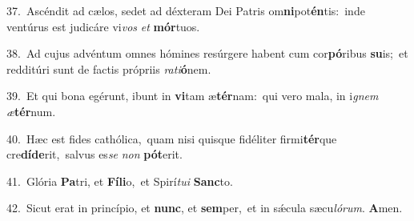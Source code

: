 {\numbfont\textcolor{\numbcolor}{37.}}~Ascéndit ad cælos, sedet ad déxteram Dei Patris om\-\textbf{ni}\-pot\-\textbf{én}\-tis:~\star inde ventúrus est judicáre vi\textit{vos} \textit{et} \textbf{mór}\-tuos.\par
{\numbfont\textcolor{\numbcolor}{38.}}~Ad cujus advéntum omnes hómines resúrgere habent cum cor\-\textbf{pó}\-ribus \textbf{su}\-is;~\star et redditúri sunt de factis própriis \textit{ra}\-\textit{ti}\textbf{ó}nem.\par
{\numbfont\textcolor{\numbcolor}{39.}}~Et qui bona egérunt, ibunt in \textbf{vi}\-tam æ\-\textbf{tér}\-nam:~\star qui vero mala, in i\textit{gnem} \textit{æ}\-\textbf{tér}num.\par
{\numbfont\textcolor{\numbcolor}{40.}}~Hæc est fides cathólica,~\dagger quam nisi quisque fidéliter firmi\-\textbf{tér}\-que cre\-\textbf{dí}\-\textbf{de}rit,~\star salvus es\textit{se} \textit{non} \textbf{pót}\-erit.\par
{\numbfont\textcolor{\numbcolor}{41.}}~Glória \textbf{Pa}\-tri, et \textbf{Fí}\-\textbf{li}o,~\star et Spirí\-\textit{tu}\-\textit{i} \textbf{Sanc}\-to.\par
{\numbfont\textcolor{\numbcolor}{42.}}~Sicut erat in princípio, et \textbf{nunc}\-, et \textbf{sem}\-per,~\star et in sǽcula sæcu\-\textit{ló}\-\textit{rum}. \textbf{A}\-men.\par
